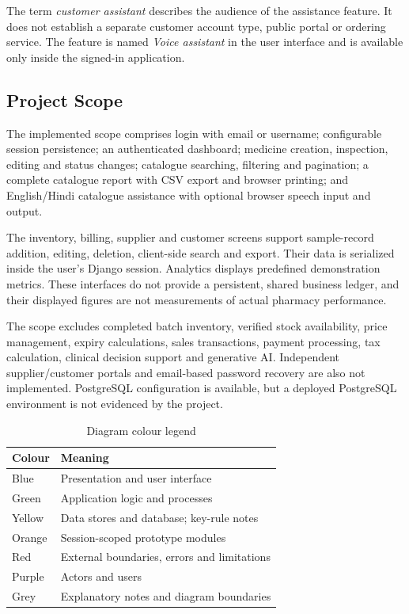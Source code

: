 \documentclass{article}
\begin{document}
The term \emph{customer assistant} describes the audience of the assistance feature. It does not establish a separate customer account type, public portal or ordering service. The feature is named \emph{Voice assistant} in the user interface and is available only inside the signed-in application.

\subsection{Project Scope}
The implemented scope comprises login with email or username; configurable session persistence; an authenticated dashboard; medicine creation, inspection, editing and status changes; catalogue searching, filtering and pagination; a complete catalogue report with CSV export and browser printing; and English/Hindi catalogue assistance with optional browser speech input and output.

The inventory, billing, supplier and customer screens support sample-record addition, editing, deletion, client-side search and export. Their data is serialized inside the user's Django session. Analytics displays predefined demonstration metrics. These interfaces do not provide a persistent, shared business ledger, and their displayed figures are not measurements of actual pharmacy performance.

The scope excludes completed batch inventory, verified stock availability, price management, expiry calculations, sales transactions, payment processing, tax calculation, clinical decision support and generative AI. Independent supplier/customer portals and email-based password recovery are also not implemented. PostgreSQL configuration is available, but a deployed PostgreSQL environment is not evidenced by the project.

\begin{table}[H]\centering\small
\caption{Diagram colour legend}\label{tab:legend}
\begin{tabularx}{\textwidth}{@{}YY@{}}
\toprule Colour & Meaning\\\midrule
{}Blue & Presentation and user interface\\
Green & Application logic and processes\\
Yellow & Data stores and database; key-rule notes\\
Orange & Session-scoped prototype modules\\
Red & External boundaries, errors and limitations\\
Purple & Actors and users\\
Grey & Explanatory notes and diagram boundaries\\
\bottomrule\end{tabularx}
\end{table}
\end{document}
